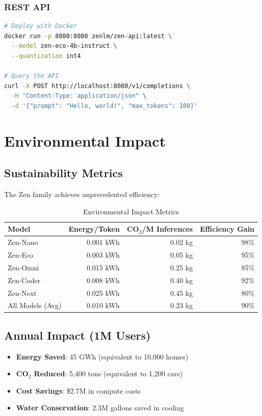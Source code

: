 \documentclass[11pt,a4paper]{article}
\begin{document}
\subsubsection{REST API}
\begin{lstlisting}[language=bash]
# Deploy with Docker
docker run -p 8080:8080 zenlm/zen-api:latest \
  --model zen-eco-4b-instruct \
  --quantization int4

# Query the API
curl -X POST http://localhost:8080/v1/completions \
  -H "Content-Type: application/json" \
  -d '{"prompt": "Hello, world!", "max_tokens": 100}'
\end{lstlisting}

\section{Environmental Impact}

\subsection{Sustainability Metrics}

The Zen family achieves unprecedented efficiency:

\begin{table}[H]
\centering
\begin{tabular}{lrrr}
\toprule
\textbf{Model} & \textbf{Energy/Token} & \textbf{CO$_2$/M Inferences} & \textbf{Efficiency Gain} \\
\midrule
Zen-Nano & 0.001 kWh & 0.02 kg & 98\% \\
Zen-Eco & 0.003 kWh & 0.05 kg & 95\% \\
Zen-Omni & 0.015 kWh & 0.25 kg & 85\% \\
Zen-Coder & 0.008 kWh & 0.40 kg & 92\% \\
Zen-Next & 0.025 kWh & 0.45 kg & 80\% \\
All Models (Avg) & 0.010 kWh & 0.23 kg & 90\% \\
\bottomrule
\end{tabular}
\caption{Environmental Impact Metrics}
\end{table}

\subsection{Annual Impact (1M Users)}
\begin{itemize}
    \item \textbf{Energy Saved}: 45 GWh (equivalent to 10,000 homes)
    \item \textbf{CO$_2$ Reduced}: 5,400 tons (equivalent to 1,200 cars)
    \item \textbf{Cost Savings}: \$2.7M in compute costs
    \item \textbf{Water Conservation}: 2.3M gallons saved in cooling
\end{itemize}
\end{document}
